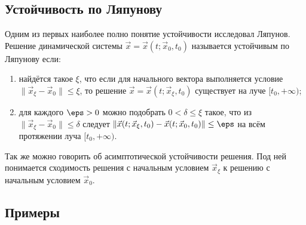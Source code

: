 \subsection{Устойчивость по Ляпунову}
Одним из первых наиболее полно понятие устойчивости исследовал Ляпунов.
Решение динамической системы \( \vec{x} = \vec{x}(t;\vec{x}_0,t_0) \) называется
устойчивым по Ляпунову если:
\begin{enumerate}
    \item найдётся такое \( \xi \), что если для начального вектора выполняется
        условие \( \| \vec{x}_\xi - \vec{x}_0 \| \le \xi \), то решение
        \( \vec{x} = \vec{x}(t;\vec{x}_\xi,t_0) \) существует на луче
        \( [t_0, +\infty) \);
    \item для каждого \( \eps > 0 \) можно подобрать \( 0 < \delta \le \xi \)
        такое, что из \( \| \vec{x}_\xi - \vec{x}_0 \| \le \delta \) следует
        \( \| \vec{x}(t;\vec{x}_\xi,t_0) - \vec{x}(t;\vec{x}_0,t_0) \| \le
        \eps \) на всём протяжении луча \( [t_0, +\infty) \).
\end{enumerate}
Так же можно говорить об асимптотической устойчивости решения. Под ней
понимается сходимость решения с начальным условием \( \vec{x}_\xi \) к решению с
начальным условием \( \vec{x}_0 \).

\subsection{Примеры}
